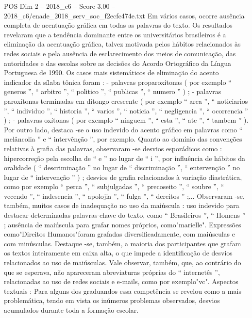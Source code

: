 \begin{textsample}{POS Dim 2 – 2018\_c6 – Score 3.00 – 2018\_c6/enade\_2018\_serv\_soc\_f2ecfc474e.txt}
Em vários casos, ocorre ausência completa de acentuação gráfica em todas as palavras do texto.
Os resultados revelaram que a tendência dominante entre os universitários brasileiros é a eliminação da acentuação gráfica, talvez motivada pelos hábitos relacionados às redes sociais e pela ausência de esclarecimento dos meios de comunicação, das autoridades e das escolas sobre as decisões do Acordo Ortográfico da Língua Portuguesa de 1990.
Os casos mais sistemáticos de eliminação do acento indicador da sílaba tônica foram : - palavras proparoxítonas ( por exemplo “ generos ”, “ arbitro ”, “ politico ”, “ publicas ”, “ numero ” ) ; - palavras paroxítonas terminadas em ditongo crescente ( por exemplo “ area ”, “ noticiarios ”, “ individuo ”, “ historia ”, “ varios ”, “ noticia ”, “ negligencia ”, “ ocorrencia ” ) ; - palavras oxítonas ( por exemplo “ ninguem ”, “ esta ”, “ ate ”, “ tambem ” ).
Por outro lado, destaca -se o uso indevido do acento gráfico em palavras como “ melâncolia ” e “ intervênção ”, por exemplo.
Quanto ao domínio das convenções relativas à grafia das palavras, observaram -se desvios esporádicos como : hipercorreção pela escolha de “ e ” no lugar de “ i ”, por influência de hábitos da oralidade ( “ descriminação ” no lugar de “ discriminação ”, “ entervenção ” no lugar de “ intervenção ” ) ; desvios de grafia relacionados à variação diastrática, como por exemplo “ perca ”, “ subjulgadas ”, “ precoseito ”, “ soubre ”, “ vecendo ”, “ indesencia ”, “ apolojia ”, “ fulga ”, “ dereitos ” ;...
Observaram -se, também, muitos casos de inadequação no uso da maiúscula : uso indevido para destacar determinadas palavras-chave do texto, como “ Brasileiros ”, “ Homens ” ; ausência de maiúscula para grafar nomes próprios, como"marielle".
Expressões como"Direitos Humanos"foram grafadas diversificadamente, com maiúsculas e com minúsculas.
Destaque -se, também, a maioria dos participantes que grafam os textos inteiramente em caixa alta, o que impede a identificação de desvios relacionados ao uso de maiúsculas.
Vale observar, também, que, ao contrário do que se esperava, não apareceram abreviaturas próprias do “ internetês ”, relacionadas ao uso de redes sociais e e-mails, como por exemplo"vc".
Aspectos textuais : Para alguns dos graduandos essa competência se revelou como a mais problemática, tendo em vista os inúmeros problemas observados, desvios acumulados durante toda a formação escolar.

\end{textsample}
